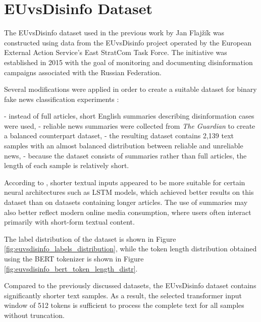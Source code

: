 \FloatBarrier

\section{EUvsDisinfo Dataset}

\begin{markdown}

The EUvsDisinfo dataset used in the previous work by Jan Flajžík \cite{flajzik_classification_2024} was constructed using data from the EUvsDisinfo project operated by the European External Action Service’s East StratCom Task Force. The initiative was established in 2015 with the goal of monitoring and documenting disinformation campaigns associated with the Russian Federation.

Several modifications were applied in order to create a suitable dataset for binary fake news classification experiments \cite{flajzik_classification_2024}:

- instead of full articles, short English summaries describing disinformation cases were used,
- reliable news summaries were collected from \textit{The Guardian} to create a balanced counterpart dataset,
- the resulting dataset contains 2,139 text samples with an almost balanced distribution between reliable and unreliable news,
- because the dataset consists of summaries rather than full articles, the length of each sample is relatively short.

According to \cite{flajzik_classification_2024}, shorter textual inputs appeared to be more suitable for certain neural architectures such as LSTM models, which achieved better results on this dataset than on datasets containing longer articles. The use of summaries may also better reflect modern online media consumption, where users often interact primarily with short-form textual content.

The label distribution of the dataset is shown in Figure \ref{fig:euvsdisinfo_labels_distribution}, while the token length distribution obtained using the BERT tokenizer is shown in Figure \ref{fig:euvsdisinfo_bert_token_length_distr}.

Compared to the previously discussed datasets, the EUvsDisinfo dataset contains significantly shorter text samples. As a result, the selected transformer input window of 512 tokens is sufficient to process the complete text for all samples without truncation.

\end{markdown}

